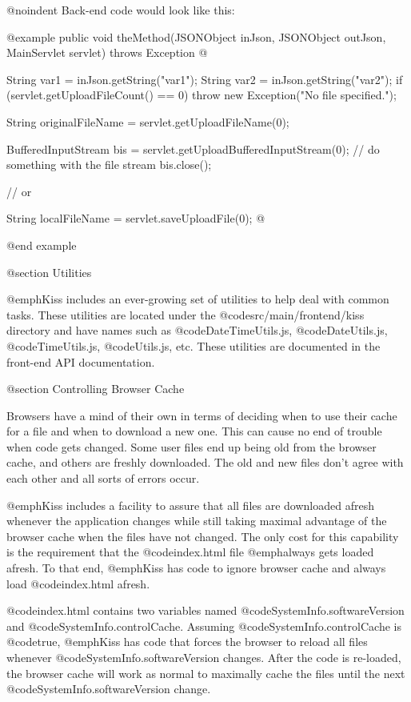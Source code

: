 @noindent
Back-end code would look like this:

@example
public void theMethod(JSONObject inJson, JSONObject outJson, MainServlet servlet) throws Exception @{
    String var1 = inJson.getString("var1");
    String var2 = inJson.getString("var2");
    if (servlet.getUploadFileCount() == 0)
        throw new Exception("No file specified.");
        
    String originalFileName = servlet.getUploadFileName(0);
    
    
    BufferedInputStream bis = servlet.getUploadBufferedInputStream(0);
    // do something with the file stream
    bis.close();
    
         // or
         
    String localFileName = servlet.saveUploadFile(0);
@}
@end example




@section Utilities

@emph{Kiss} includes an ever-growing set of utilities to help deal with common tasks.
These utilities are located under the @code{src/main/frontend/kiss} directory and have names such as
@code{DateTimeUtils.js}, @code{DateUtils.js}, @code{TimeUtils.js}, @code{Utils.js}, etc.  These utilities
are documented in the front-end API documentation.

@section Controlling Browser Cache

Browsers have a mind of their own in terms of deciding when to use
their cache for a file and when to download a new one.  This can cause
no end of trouble when code gets changed.  Some user files end up
being old from the browser cache, and others are freshly downloaded.
The old and new files don't agree with each other and all sorts of
errors occur.

@emph{Kiss} includes a facility to assure that all files are
downloaded afresh whenever the application changes while still taking
maximal advantage of the browser cache when the files have not
changed.  The only cost for this capability is the requirement
that the @code{index.html} file @emph{always} gets loaded afresh.
To that end, @emph{Kiss} has code to ignore browser cache and always load
@code{index.html} afresh.

@code{index.html} contains two variables named @code{SystemInfo.softwareVersion} and @code{SystemInfo.controlCache}.
Assuming @code{SystemInfo.controlCache} is @code{true}, @emph{Kiss} has code that forces the browser
to reload all files whenever @code{SystemInfo.softwareVersion} changes.  After the code is re-loaded,
the browser cache will work as normal to maximally cache the files until the next
@code{SystemInfo.softwareVersion} change.

